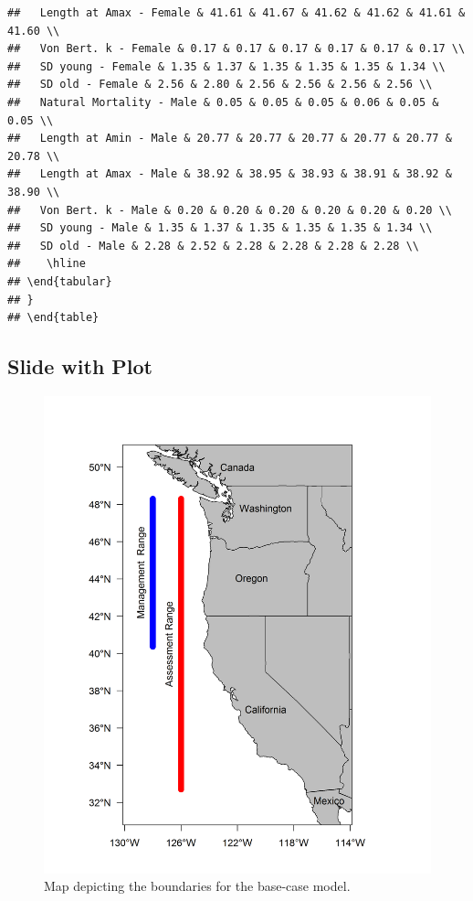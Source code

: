 \documentclass[10pt,]{article}
\begin{document}
\begin{verbatim}
##   Length at Amax - Female & 41.61 & 41.67 & 41.62 & 41.62 & 41.61 & 41.60 \\ 
##   Von Bert. k - Female & 0.17 & 0.17 & 0.17 & 0.17 & 0.17 & 0.17 \\ 
##   SD young - Female & 1.35 & 1.37 & 1.35 & 1.35 & 1.35 & 1.34 \\ 
##   SD old - Female & 2.56 & 2.80 & 2.56 & 2.56 & 2.56 & 2.56 \\ 
##   Natural Mortality - Male & 0.05 & 0.05 & 0.05 & 0.06 & 0.05 & 0.05 \\ 
##   Length at Amin - Male & 20.77 & 20.77 & 20.77 & 20.77 & 20.77 & 20.78 \\ 
##   Length at Amax - Male & 38.92 & 38.95 & 38.93 & 38.91 & 38.92 & 38.90 \\ 
##   Von Bert. k - Male & 0.20 & 0.20 & 0.20 & 0.20 & 0.20 & 0.20 \\ 
##   SD young - Male & 1.35 & 1.37 & 1.35 & 1.35 & 1.35 & 1.34 \\ 
##   SD old - Male & 2.28 & 2.52 & 2.28 & 2.28 & 2.28 & 2.28 \\ 
##    \hline
## \end{tabular}
## }
## \end{table}
\end{verbatim}

\subsection{Slide with Plot}\label{slide-with-plot}

\begin{figure}
\centering
\includegraphics{assess_region_map.png}
\caption{Map depicting the boundaries for the base-case model.
\label{fig:assess_region_map}}
\end{figure}
\end{document}
